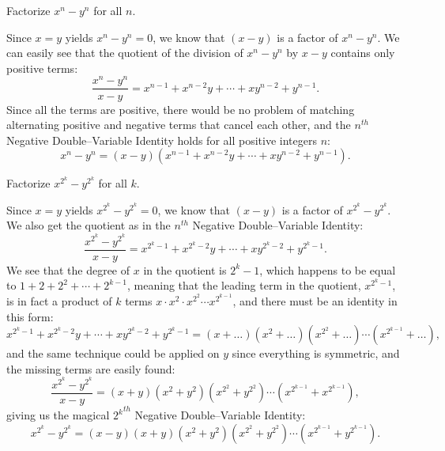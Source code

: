 \documentclass[12pt,a4paper]{memoir}
\theoremstyle{definition}
\begin{document}
\begin{tcolorbox}
	\begin{question}[name=($n^{\text{th}}$ Negative Double--Variable Identity)]
		Factorize $x^n-y^n$ for all $n$.
	\end{question}
\end{tcolorbox}

\begin{solution}[name=Solution by Amir Parvardi]
	Since $x=y$ yields $x^n-y^n=0$, we know that $(x-y)$ is a factor of $x^n-y^n$. We can easily see that the quotient of the division of $x^n-y^n$ by $x-y$ contains only positive terms:
	$$\frac{x^n-y^n}{x-y} = x^{n-1}+x^{n-2}y+\cdots+xy^{n-2}+y^{n-1}.$$
	Since all the terms are positive, there would be no problem of matching alternating positive and negative terms that cancel each other, and the $n^{th}$ Negative Double--Variable Identity holds for all positive integers $n$:
	$$x^n-y^n = (x-y)\left(x^{n-1}+x^{n-2}y+\cdots+xy^{n-2}+y^{n-1}\right).$$
\end{solution}



\begin{tcolorbox}
	\begin{question}[name=(${2^k}^{th}$ Negative Double--Variable Identity)]
		Factorize $x^{2^k}-y^{2^k}$ for all $k$.
	\end{question}
\end{tcolorbox}

\begin{solution}[name=Solution by Amir Parvardi]
	Since $x=y$ yields $x^{2^k}-y^{2^k}=0$, we know that $(x-y)$ is a factor of $x^{2^k}-y^{2^k}$. We also get the quotient as in the $n^{th}$ Negative Double--Variable Identity:
	$$\frac{x^{2^k}-y^{2^k}}{x-y} = x^{2^k-1}+x^{2^k-2}y+\cdots+xy^{2^k-2}+y^{2^k-1}.$$
	We see that the degree of $x$ in the quotient is $2^k-1$, which happens to be equal to $1+2+2^2+\cdots+2^{k-1}$, meaning that the leading term in the quotient, $x^{2^k-1}$, is in fact a product of $k$ terms $x \cdot x^2 \cdot x^{2^2} \cdots x^{2^{k-1}}$, and there must be an identity in this form:
	$$ x^{2^k-1}+x^{2^k-2}y+\cdots+xy^{2^k-2}+y^{2^k-1} = (x+\dots)(x^2+\dots)(x^{2^2}+\dots)\cdots (x^{2^{k-1}}+\dots),$$
	and the same technique could be applied on $y$ since everything is symmetric, and the missing terms are easily found:
	$$\frac{x^{2^k}-y^{2^k}}{x-y} =  (x+y)(x^2+y^2)(x^{2^2}+y^{2^2})\cdots (x^{2^{k-1}}+x^{2^{k-1}}),$$
	giving us the magical ${2^k}^{th}$ Negative Double--Variable Identity:
	$$x^{2^k}-y^{2^k} = (x-y)(x+y)(x^2+y^2)(x^{2^2}+y^{2^2})\cdots (x^{2^{k-1}}+y^{2^{k-1}}).$$
\end{solution}
\end{document}
